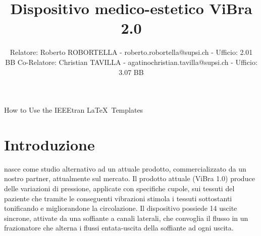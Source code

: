 \documentclass[lettersize,journal,onecolumn]{IEEEtran}
\begin{document}
\title{Dispositivo medico-estetico ViBra 2.0}
\author{Relatore: Roberto ROBORTELLA - roberto.robortella@supsi.ch - Ufficio: 2.01 BB \newline
Co-Relatore: Christian TAVILLA - agatinochristian.tavilla@supsi.ch - Ufficio: 3.07 BB}

%
{How to Use the IEEEtran \LaTeX \ Templates}

\maketitle


\section{Introduzione}
 nasce come studio alternativo ad un attuale prodotto, commercializzato da un nostro partner, attualmente sul mercato.
Il prodotto attuale (ViBra 1.0) produce delle variazioni di pressione, applicate con specifiche cupole, sui tessuti del paziente che tramite le conseguenti vibrazioni stimola i tessuti sottostanti tonificando e migliorandone la circolazione.
Il dispositivo possiede 14 uscite sincrone, attivate da una soffiante a canali laterali, che convoglia il flusso in un frazionatore che alterna i flussi entata-uscita della soffiante ad ogni uscita.
\end{document}

